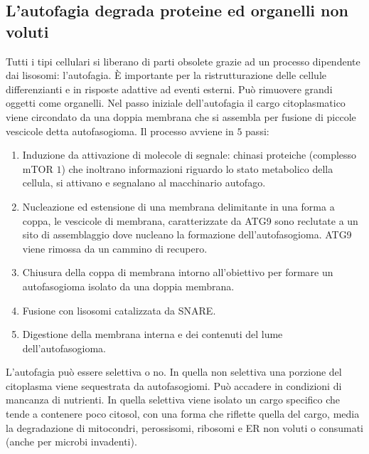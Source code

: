 \subsection{L'autofagia degrada proteine ed organelli non voluti}
Tutti i tipi cellulari si liberano di parti obsolete grazie ad un processo dipendente dai lisosomi: l'autofagia. \`E importante per la ristrutturazione delle cellule differenzianti e in
risposte adattive ad eventi esterni. Pu\`o rimuovere grandi oggetti come organelli. Nel passo iniziale dell'autofagia il cargo citoplasmatico viene circondato da una doppia membrana
che si assembla per fusione di piccole vescicole detta autofasogioma. Il processo avviene in $5$ passi:
\begin{enumerate}
	\item Induzione da attivazione di molecole di segnale: chinasi proteiche (complesso mTOR $1$) che inoltrano informazioni riguardo lo stato metabolico della cellula, si attivano
		e segnalano al macchinario autofago.
	\item Nucleazione ed estensione di una membrana delimitante in una forma a coppa, le vescicole di membrana, caratterizzate da ATG9 sono reclutate a un sito di assemblaggio dove
		nucleano la formazione dell'autofasogioma. ATG9 viene rimossa da un cammino di recupero.
	\item Chiusura della coppa di membrana intorno all'obiettivo per formare un autofasogioma isolato da una doppia membrana.
	\item Fusione con lisosomi catalizzata da SNARE.
	\item Digestione della membrana interna e dei contenuti del lume dell'autofasogioma.
\end{enumerate}
L'autofagia pu\`o essere selettiva o no. In quella non selettiva una porzione del citoplasma viene sequestrata da autofasogiomi. Pu\`o accadere in condizioni di mancanza di nutrienti. 
In quella selettiva viene isolato un cargo specifico che tende a contenere poco citosol, con una forma che riflette quella del cargo, media la degradazione di mitocondri, perossisomi, 
ribosomi e ER non voluti o consumati (anche per microbi invadenti). 
